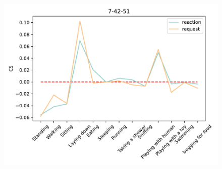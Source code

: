 \begin{figure}[ht]
\begin{minipage}[b]{.3\linewidth}
			\includegraphics[width=0.99\linewidth]{./35word/7-42-51.pdf}
		\end{minipage}


\end{figure}
